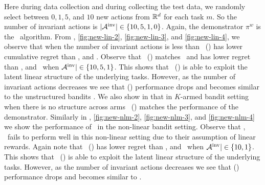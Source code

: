 \documentclass[10pt]{article}
\theoremstyle{plain}
\theoremstyle{definition}
\theoremstyle{remark}
\begin{document}
Here during data collection and during collecting the test data, we randomly select between $0, 1, 5$, and $10$ new actions from $\mathbb{R}^d$ for each task $m$.
So the number of invariant actions is $|\mathcal{A}^{\text{inv}}| \in \{10, 5, 1, 0\}$.
Again, the demonstrator $\pi^w$ is the \ts\ algorithm. From , \ref{fig:new-lin-2}, \ref{fig:new-lin-3}, and \ref{fig:new-lin-4}, we observe that when the number of invariant actions is less than \pred\ (\gt) has lower cumulative regret than \dptg, and \ad.
Observe that \pred\ (\gt) matches \linucb\ and has lower regret than \dptg, and \ad\ when $\mathcal{A}^{\text{inv}}| \in \{10, 5, 1\}$. This shows that \pred\ (\gt) is able to exploit the latent linear structure of the underlying tasks. However, as the number of invariant actions decreases we see that \pred (\gt) performance drops and becomes similar to the unstructured bandits \ts. We also show in  that in $K$-armed bandit setting when there is no structure across arms \pred\ (\gt) matches the performance of the demonstrator.
Similarly in , \ref{fig:new-nlm-2}, \ref{fig:new-nlm-3}, and \ref{fig:new-nlm-4} we show the performance of \pred\ in the non-linear bandit setting. Observe that \linucb, \mlin\ fails to perform well in this non-linear setting due to their assumption of linear rewards. Again note that \pred\ (\gt) has lower regret than \dptg, and \ad\ when $\mathcal{A}^{\text{inv}}| \in \{10, 1\}$. This shows that \pred\ (\gt) is able to exploit the latent linear structure of the underlying tasks. However, as the number of invariant actions decreases we see that \pred (\gt) performance drops and becomes similar to \ad.
\vspace*{-0.6em}
\end{document}

